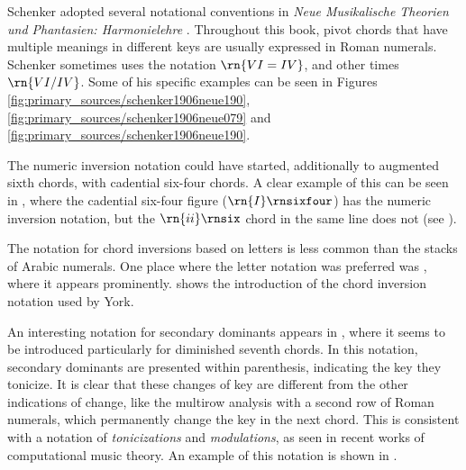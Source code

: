 Schenker adopted several notational conventions in
\emph{Neue Musikalische Theorien und Phantasien:
Harmonielehre} \parencite{schenker1906neue}. Throughout this
book, pivot chords that have multiple meanings in different
keys are usually expressed in Roman numerals. Schenker
sometimes uses the notation $\rn{VI=IV}$, and other times
$\rn{VI/IV}$. Some of his specific examples can be seen in
Figures \ref{fig:primary_sources/schenker1906neue190},
\ref{fig:primary_sources/schenker1906neue079} and
\ref{fig:primary_sources/schenker1906neue190}.




The numeric inversion notation could have started,
additionally to augmented sixth chords, with cadential
six-four chords. A clear example of this can be seen in
\textcite{loewengard1908lehrbuch}, where the cadential
six-four figure ($\rn{I}\rnsixfour$) has the numeric
inversion notation, but the $\rn{ii}\rnsix$ chord in the
same line does not (see
).


The notation for chord inversions based on letters is less
common than the stacks of Arabic numerals. One place where
the letter notation was preferred was
\textcite{york1909practical}, where it appears prominently.
 shows the
introduction of the chord inversion notation used by York.


An interesting notation for secondary dominants appears in
\textcite{white1911harmonic}, where it seems to be
introduced particularly for diminished seventh chords. In
this notation, secondary dominants are presented within
parenthesis, indicating the key they tonicize. It is clear
that these changes of key are different from the other
indications of change, like the multirow analysis with a
second row of Roman numerals, which permanently change the
key in the next chord. This is consistent with a notation of
\emph{tonicizations} and \emph{modulations}, as seen in
recent works of computational music theory. An example of
this notation is shown in
.


